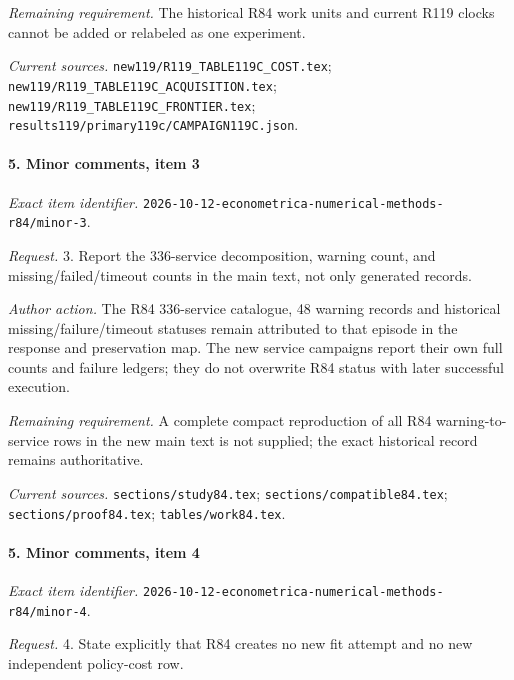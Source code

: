 \par\emph{Remaining requirement.} The historical R84 work units and current R119 clocks cannot be added or relabeled as one experiment.

\par\emph{Current sources.} \nolinkurl{new119/R119_TABLE119C_COST.tex}; \nolinkurl{new119/R119_TABLE119C_ACQUISITION.tex}; \nolinkurl{new119/R119_TABLE119C_FRONTIER.tex}; \nolinkurl{results119/primary119c/CAMPAIGN119C.json}.

\paragraph{5. Minor comments, item 3}

\emph{Exact item identifier.} \nolinkurl{2026-10-12-econometrica-numerical-methods-r84/minor-3}.

\par\emph{Request.} 3. Report the 336-service decomposition, warning count, and missing/\allowbreak{}failed/\allowbreak{}timeout counts in the main text, not only generated records.

\par\emph{Author action.} The R84 336-service catalogue, 48 warning records and historical missing/\allowbreak{}failure/\allowbreak{}timeout statuses remain attributed to that episode in the response and preservation map. The new service campaigns report their own full counts and failure ledgers; they do not overwrite R84 status with later successful execution.

\par\emph{Remaining requirement.} A complete compact reproduction of all R84 warning-to-service rows in the new main text is not supplied; the exact historical record remains authoritative.

\par\emph{Current sources.} \nolinkurl{sections/study84.tex}; \nolinkurl{sections/compatible84.tex}; \nolinkurl{sections/proof84.tex}; \nolinkurl{tables/work84.tex}.

\paragraph{5. Minor comments, item 4}

\emph{Exact item identifier.} \nolinkurl{2026-10-12-econometrica-numerical-methods-r84/minor-4}.

\par\emph{Request.} 4. State explicitly that R84 creates no new fit attempt and no new independent policy-cost row.

